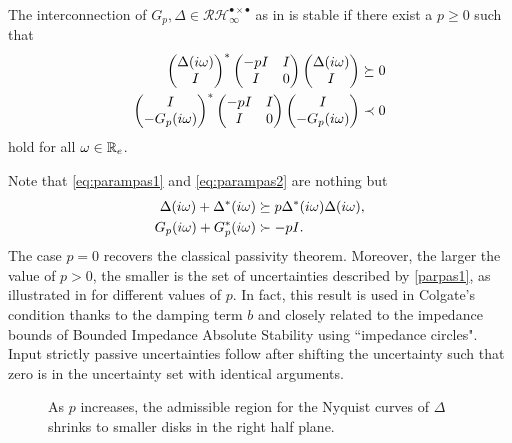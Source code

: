 \begin{coroll}\label{thm:desvidpass} The interconnection of $G_p,\Delta\in 
\mathcal{RH}^{\bullet \times \bullet}_\infty$ as in  is stable
if there exist a ${p\geq 0}$ such that
\begin{align}
\begin{pmatrix}\Delta(i\omega)\\I\end{pmatrix}^*\begin{pmatrix}-pI &I\\I &0\end{pmatrix}\begin{pmatrix}\Delta(i\omega)\\ I\end{pmatrix} &\succeq 0 \label{eq:parampas1}\\
\begin{pmatrix}I\\ -G_p(i\omega)\end{pmatrix}^*\begin{pmatrix}-pI &I\\I &0\end{pmatrix}\begin{pmatrix}I\\ -G_p(i\omega)\end{pmatrix} &\prec 0 \label{eq:parampas2}
\end{align} hold for all $\omega\in\mathbb{R}_e$.
\end{coroll}

\begin{rem}Note that \eqref{eq:parampas1} and \eqref{eq:parampas2} are nothing but
\begin{align}
	\Delta(i\omega) + \Delta^*(i\omega) &\succeq p\Delta^*(i\omega)\Delta(i\omega),\label{parpas1}\\
	G_p(i\omega) + G_p^*(i\omega) &\succ -pI.\label{parpas2}
\end{align}
The case $p=0$ recovers the classical passivity theorem. Moreover, the larger the value of $p>0$, 
the smaller is the set of uncertainties described by \eqref{parpas1}, as illustrated in  
for different values of $p$. In fact, this result is used in Colgate's condition thanks to the damping term 
$b$ and closely related to the impedance bounds of Bounded Impedance Absolute Stability \cite{haddadizaad} 
using ``impedance circles". Input strictly passive uncertainties follow after shifting the uncertainty such 
that zero is in the uncertainty set with identical arguments. 
\end{rem}

\begin{figure}%
\centering
{}
\caption[Parametrized strictly output passive uncertainty regions]{As $p$ increases, the admissible region for the Nyquist curves of $\Delta$ shrinks to smaller disks in the right half plane.}
\label{fig:pregions}%
\end{figure}

